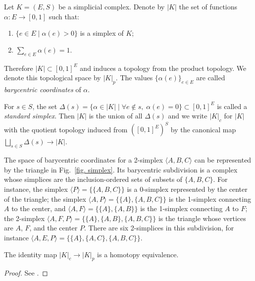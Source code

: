 \begin{defn}
    Let $K=(E,S)$ be a simplicial complex. Denote by $|K|$ the set of functions $\alpha:E\to [0,1]$ such that:
    \begin{enumerate}
        \item $\{e\in E\mid\alpha(e)>0\}$ is a simplex of $K$;
        \item $\sum_{e\in E}\alpha(e)=1$.
    \end{enumerate}
    Therefore $|K|\subset [0,1]^E$ and induces a topology from the product topology. We denote this topological space by $|K|_p$. The values $\{\alpha(e)\}_{e\in E}$ are called \emph{barycentric coordinates} of $\alpha$.
    
    For $s\in S$, the set $\Delta(s)=\{\alpha\in |K|\mid \forall e\notin s,\; \alpha(e)=0\}\subset [0,1]^E$ is called a \emph{standard simplex}. Then $|K|$ is the union of all $\Delta(s)$ and we write $|K|_c$ for $|K|$ with the quotient topology induced from $\left([0,1]^E\right)^S$ by the canonical map $\bigsqcup_{s\in S}\Delta(s)\to |K|$.
\end{defn}

\begin{example}
    The space of barycentric coordinates for a 2-simplex $\langle A,B,C\rangle$ can be represented by the triangle in Fig.~\ref{fig. simplex}. Its barycentric subdivision is a complex whose simplices are the inclusion-ordered sets of subsets of $\{A,B,C\}$. For instance, the simplex $\langle P\rangle=\{\{A,B,C\}\}$ is a $0$-simplex represented by the center of the triangle; the simplex $\langle A,P\rangle=\{\{A\},\{A,B,C\}\}$ is the 1-simplex connecting $A$ to the center, and $\langle A,F\rangle=\{\{A\},\{A,B\}\}$ is the 1-simplex connecting $A$ to $F$; the 2-simplex $\langle A,F,P \rangle=\{\{A\},\{A,B\},\{A,B,C\}\}$ is the triangle whose vertices are $A$, $F$, and the center $P$. There are six 2-simplices in this subdivision, for instance $\langle A,E,P\rangle=\{\{A\},\{A,C\},\{A,B,C\}\}$.
\end{example}


\begin{prop}
    The identity map $|K|_c\to |K|_p$ is a homotopy equivalence.
\end{prop}
\begin{proof}
    See \cite[Prop. 8.1.4 and 13.2.2]{tomDieck}.
\end{proof}

